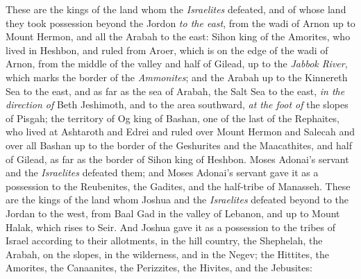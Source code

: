 \begin{biblechapter} %
 These are the kings of the land whom the \textit{Israelites} defeated, and of whose land they took possession beyond the Jordon \textit{to the east}, from the wadi of Arnon up to Mount Hermon, and all the Arabah to the east:
\verse Sihon king of the Amorites, who lived in Heshbon, and ruled from Aroer, which is on the edge of the wadi of Arnon, from the middle of the valley and half of Gilead, up to the \textit{Jabbok River}, which marks the border of the \textit{Ammonites};
\verse and the Arabah up to the Kinnereth Sea to the east, and as far as the sea of Arabah, the Salt Sea to the east, \textit{in the direction of} Beth Jeshimoth, and to the area southward, \textit{at the foot of} the slopes of Pisgah;
\verse the territory of Og king of Bashan, one of the last of the Rephaites, who lived at Ashtaroth and Edrei
\verse and ruled over Mount Hermon and Salecah and over all Bashan up to the border of the Geshurites and the Maacathites, and half of Gilead, as far as the border of Sihon king of Heshbon.
\verse Moses Adonai’s servant and the \textit{Israelites} defeated them; and Moses Adonai’s servant gave it as a possession to the Reubenites, the Gadites, and the half-tribe of Manasseh.
 These are the kings of the land whom Joshua and the \textit{Israelites} defeated beyond to the Jordan to the west, from Baal Gad in the valley of Lebanon, and up to Mount Halak, which rises to Seir. And Joshua gave it as a possession to the tribes of Israel according to their allotments,
\verse in the hill country, the Shephelah, the Arabah, on the slopes, in the wilderness, and in the Negev; the Hittites, the Amorites, the Canaanites, the Perizzites, the Hivites, and the Jebusites:

\end{biblechapter}
